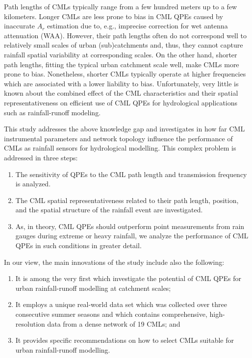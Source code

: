 \documentclass{ctuthesis}\usepackage[]{graphicx}\usepackage[]{color}
\begin{document}
Path lengths of CMLs typically range from a few hundred meters up to a few kilometers. Longer CMLs are less prone to bias in CML QPEs caused by inaccurate $A_r$ estimation due to, e.g., imprecise correction for wet antenna attenuation (WAA). However, their path lengths often do not correspond well to relatively small scales of urban (sub)catchments and, thus, they cannot capture rainfall spatial variability at corresponding scales. On the other hand, shorter path lengths, fitting the typical urban catchment scale well, make CMLs more prone to bias. Nonetheless, shorter CMLs typically operate at higher frequencies which are associated with a lower liability to bias. Unfortunately, very little is known about the combined effect of the CML characteristics and their spatial representativeness on efficient use of CML QPEs for hydrological applications such as rainfall-runoff modeling.

This study addresses the above knowledge gap and investigates in how far CML instrumental parameters and network topology influence the performance of CMLs as rainfall sensors for hydrological modelling. This complex problem is addressed in three steps: 
        \begin{enumerate}
        \itemsep0em 
                \item{The sensitivity of QPEs to the CML path length and transmission frequency is  analyzed.}
                \item{The CML spatial representativeness related to their path length, position, and the spatial structure of the rainfall event are investigated.}
                \item{As, in theory, CML QPEs should outperform point measurements from rain gauges during extreme or heavy rainfall, we analyze the performance of CML QPEs in such conditions in greater detail.}
        \end{enumerate}

In our view, the main innovations of the study include also the following:
        \begin{enumerate}
        \itemsep0em 
                \item{It is among the very first which investigate the potential of CML QPEs for urban rainfall-runoff modelling at catchment scales;}
                \item{It employs a unique real-world data set which was collected over three consecutive summer seasons and which contains comprehensive, high-resolution data from a dense network of 19 CMLs; and}
                \item{It provides specific recommendations on how to select CMLs suitable for urban rainfall-runoff modelling.}
        \end{enumerate}
        
\end{document}
